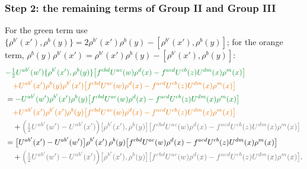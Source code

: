 \documentclass[9pt]{article}
\newcommand{\G}[1]{{\color{cG}#1}}
\newcommand{\Or}[1]{{\color{cO}#1}}
\newcommand{\Gr}[1]{{\color{cX}#1}}
\numberwithin{equation}{section}
\begin{document}
\subsubsection*{Step 2: the remaining terms of Group II and Group III}
For the green term use $\{\rho^{b'}(x'),\rho^{b}(y)\}=2\rho^{b'}(x')\rho^{b}(y)-[\rho^{b'}(x'),\rho^{b}(y)]$; for the orange term, $\rho^{b}(y)\rho^{b'}(x')=\rho^{b'}(x')\rho^{b}(y)-[\rho^{b'}(x'),\rho^{b}(y)]$:
\begin{align}
&\G{-\tfrac12U^{ab'}(w')\{\rho^{b'}(x'),\rho^{b}(y)\}\big[f^{cbd}U^{ac}(w)\rho^{d}(x)-f^{acd}U^{cb}(z)U^{dm}(x)\rho^{m}(x)\big]}\notag\\
&\quad\Or{+U^{ab'}(x')\rho^{b}(y)\rho^{b'}(x')\big[f^{cbd}U^{ac}(w)\rho^{d}(x)-f^{acd}U^{cb}(z)U^{dm}(x)\rho^{m}(x)\big]}\notag\\
&=\G{-U^{ab'}(w')\rho^{b'}(x')\rho^{b}(y)\big[f^{cbd}U^{ac}(w)\rho^{d}(x)-f^{acd}U^{cb}(z)U^{dm}(x)\rho^{m}(x)\big]}\notag\\
&\quad\Or{+U^{ab'}(x')\rho^{b'}(x')\rho^{b}(y)\big[f^{cbd}U^{ac}(w)\rho^{d}(x)-f^{acd}U^{cb}(z)U^{dm}(x)\rho^{m}(x)\big]}\notag\\
&\quad+\Gr{\Big(\tfrac12U^{ab'}(w')-U^{ab'}(x')\Big)\big[\rho^{b'}(x'),\rho^{b}(y)\big]\big[f^{cbd}U^{ac}(w)\rho^{d}(x)-f^{acd}U^{cb}(z)U^{dm}(x)\rho^{m}(x)\big]}\notag\\
&=\big[U^{ab'}(x')-U^{ab'}(w')\big]\rho^{b'}(x')\,\rho^{b}(y)\big[f^{cbd}U^{ac}(w)\rho^{d}(x)-f^{acd}U^{cb}(z)U^{dm}(x)\rho^{m}(x)\big]\notag\\
&\quad+\Gr{\Big(\tfrac12U^{ab'}(w')-U^{ab'}(x')\Big)\big[\rho^{b'}(x'),\rho^{b}(y)\big]\big[f^{cbd}U^{ac}(w)\rho^{d}(x)-f^{acd}U^{cb}(z)U^{dm}(x)\rho^{m}(x)\big]}.
\end{align}
\end{document}
